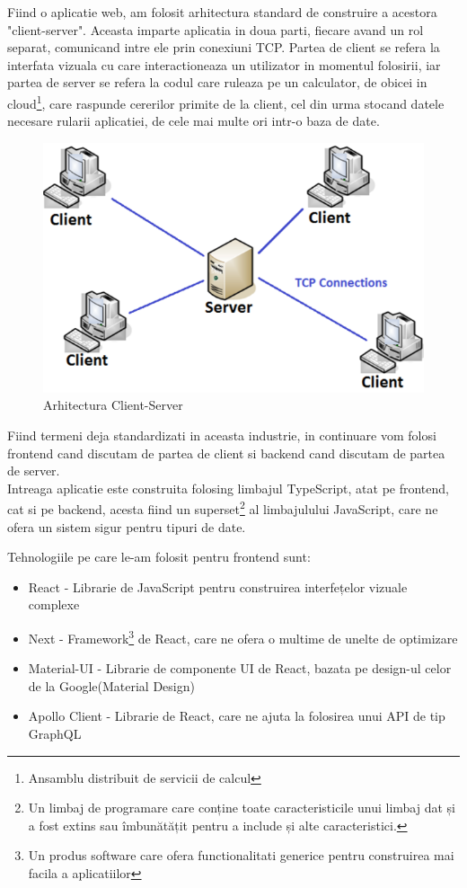 \documentclass[12pt, a4paper, oneside, romanian]{teza-upb}
\begin{document}
Fiind o aplicatie web, am folosit arhitectura standard de construire a acestora "client-server". Aceasta imparte aplicatia in doua parti, fiecare avand un rol separat, comunicand intre ele prin conexiuni TCP. Partea de client se refera la interfata vizuala cu care interactioneaza un utilizator in momentul folosirii, iar partea de server se refera la codul care ruleaza pe un calculator, de obicei in cloud\footnote{Ansamblu distribuit de servicii de calcul}, care raspunde cererilor primite de la client, cel din urma stocand datele necesare rularii aplicatiei, de cele mai multe ori intr-o baza de date.

\begin{figure}[H]
\centering
\includegraphics*[width=0.7\columnwidth]{arhitectura-client-server}
\caption{Arhitectura Client-Server}
\label{arhitectura-client-server}
\end{figure}

Fiind termeni deja standardizati in aceasta industrie, in continuare vom folosi frontend cand discutam de partea de client si backend cand discutam de partea de server. \\

Intreaga aplicatie este construita folosing limbajul TypeScript, atat pe frontend, cat si pe backend, acesta fiind un superset\footnote{Un limbaj de programare care conține toate caracteristicile unui limbaj dat și a fost extins sau îmbunătățit pentru a include și alte caracteristici.} al limbajulului JavaScript, care ne ofera un sistem sigur pentru tipuri de date.

Tehnologiile pe care le-am folosit pentru frontend sunt:
\begin{itemize}
	\item React - Librarie de JavaScript pentru construirea interfețelor vizuale complexe
	\item Next - Framework\footnote{Un produs software care ofera functionalitati generice pentru construirea mai facila a aplicatiilor} de React, care ne ofera o multime de unelte de optimizare
	\item Material-UI - Librarie de componente UI de React, bazata pe design-ul celor de la Google(Material Design)
	\item Apollo Client - Librarie de React, care ne ajuta la folosirea unui API de tip GraphQL
\end{itemize}
\end{document}
